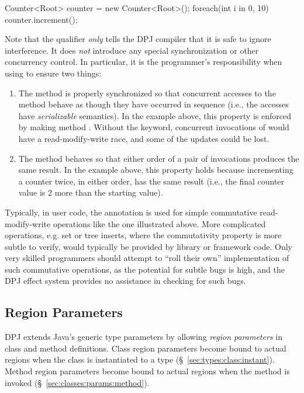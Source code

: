 \begin{dpjlisting}
Counter<Root> counter = new Counter<Root>();
foreach(int i in 0, 10)
  counter.increment();
\end{dpjlisting}

Note that the  qualifier \emph{only} tells the DPJ
compiler that it is safe to ignore interference.  It does \emph{not}
introduce any special synchronization or other concurrency control.
In particular, it is the programmer's responsibility when using
 to ensure two things:
%
\begin{enumerate}
\item The method is properly synchronized so that concurrent accesses
  to the method behave as though they have occurred in sequence (i.e.,
  the accesses have \emph{serializable} semantics).  In the example
  above, this property is enforced by making method 
  .  Without the  keyword,
  concurrent invocations of  would have a
  read-modify-write race, and some of the updates could be lost.

\item The method behaves so that either order of a pair of invocations
  produces the same result.  In the example above, this property holds
  because incrementing a counter twice, in either order, has the same
  result (i.e., the final counter value is 2 more than the starting
  value).
\end{enumerate}
%
Typically, in user code, the  annotation is used for
simple commutative read-modify-write operations like the one
illustrated above.  More complicated operations, e.g. set or tree
inserts, where the commutativity property is more subtle to verify,
would typically be provided by library or framework code.  Only very
skilled programmers should attempt to ``roll their own''
implementation of such commutative operations, as the potential for
subtle bugs is high, and the DPJ effect system provides no assistance
in checking for such bugs.

\subsection{Region Parameters%
\label{sec:classes:params}}

DPJ extends Java's generic type parameters by allowing \emph{region
  parameters} in class and method definitions.  Class region
parameters become bound to actual regions when the class is
instantiated to a type (\S~\ref{sec:types:class:instant}).  Method
region parameters become bound to actual regions when the method is
invoked (\S~\ref{sec:classes:params:method}).

